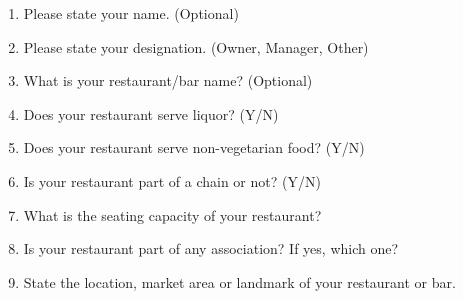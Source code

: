 \documentclass[a4paper, 12pt]{article}
\begin{document}
  \begin{mdframed}[backgroundcolor=gray!20]
		\begin {enumerate}[nosep]
		\item Please state your name. (Optional)
		\item Please state your designation. (Owner, Manager, Other)
		\item What is your restaurant/bar name? (Optional)
		\item Does your restaurant serve liquor? (Y/N)
		\item Does your restaurant serve non-vegetarian food? (Y/N)
		\item Is your restaurant part of a chain or not? (Y/N)
		\item What is the seating capacity of your restaurant?
		\item Is your restaurant part of any association? If yes, which one?
		\item State the location, market area or landmark of your restaurant or bar.
		\end {enumerate}
		

\end{mdframed}
\end{document}
